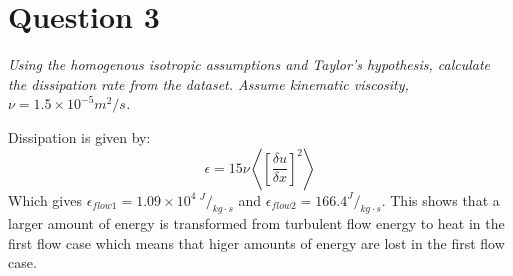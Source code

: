 \section*{Question 3}
\textit{Using the homogenous isotropic assumptions and Taylor's hypothesis, calculate the dissipation rate from the dataset. Assume kinematic viscosity, $\nu = 1.5 \times 10^{-5} m^2/s$.}

Dissipation is given by:
\begin{equation}
\epsilon = 15 \nu \left\langle\left[\frac{\delta u}{\delta x}\right]^2\right\rangle
\end{equation}
Which gives $\epsilon_{flow 1} = 1.09 \times 10^4\ ^J/_{kg \cdot s}$ and $\epsilon_{flow 2} = 166.4 ^J/_{kg \cdot s}$. This shows that a larger amount of energy is transformed from turbulent flow energy to heat in the first flow case which means that higer amounts of energy are lost in the first flow case.
